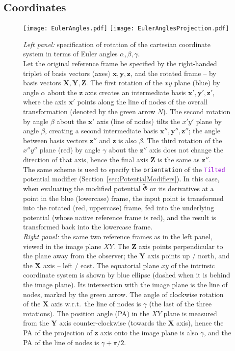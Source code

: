 \documentclass[12pt]{article}
\newcommand{\ttt}[1]{\textcolor{darkviolet}{\texttt{#1}}}
\newcommand{\ppp}[1]{\textcolor{darkolive} {\texttt{#1}}}
\newcommand{\bx}{\boldsymbol{x}}
\newcommand{\by}{\boldsymbol{y}}
\newcommand{\bz}{\boldsymbol{z}}
\newcommand{\bX}{\boldsymbol{X}}
\newcommand{\bY}{\boldsymbol{Y}}
\newcommand{\bZ}{\boldsymbol{Z}}
\begin{document}
\subsection{Coordinates}  \label{sec:CoordinateDetails}

\begin{figure}
\begin{center}
\texttt{[image: EulerAngles.pdf]} \hspace{1cm}
\texttt{[image: EulerAnglesProjection.pdf]}
\end{center}
\caption{\textit{Left panel:} specification of rotation of the cartesian coordinate system in terms of Euler angles $\alpha,\beta,\gamma$.\protect\\
Let the original reference frame be specified by the right-handed triplet of basis vectors (axes) $\bx,\by,\bz$, and the rotated frame -- by basis vectors $\bX,\bY,\bZ$.
The first rotation of the $xy$ plane (blue) by angle $\alpha$ about the $\bz$ axis creates an intermediate basis $\bx',\by',\bz'$, where the axis $\bx'$ points along the line of nodes of the overall transformation (denoted by the green arrow $N$).
The second rotation by angle $\beta$ about the $\bx'$ axis (line of nodes) tilts the $x'y'$ plane by angle $\beta$, creating a second intermediate basis $\bx'',\by'',\bz''$; the angle between basis vectors $\bz''$ and $\bz$ is also $\beta$.
The third rotation of the $x''y''$ plane (red) by angle $\gamma$ about the $\bz''$ axis does not change the direction of that axis, hence the final axis $\bZ$ is the same as $\bz''$. \protect\\
The same scheme is used to specify the \ppp{orientation} of the \ttt{Tilted} potential modifier (Section~\ref{sec:PotentialModifiers}). In this case, when evaluating the modified potential $\widetilde\Phi$ or its derivatives at a point in the blue (lowercase) frame, the input point is transformed into the rotated (red, uppercase) frame, fed into the underlying potential (whose native reference frame is red), and the result is transformed back into the lowercase frame.
\protect\\
\textit{Right panel:} the same two reference frames as in the left panel, viewed in the image plane $XY$. The $\bZ$ axis points perpendicular to the plane away from the observer; the $\bY$ axis points up / north, and the $\bX$ axis -- left / east. The equatorial plane $xy$ of the intrinsic coordinate system is shown by blue ellipse (dashed when it is behind the image plane). Its intersection with the image plane is the line of nodes, marked by the green arrow. The angle of clockwise rotation of the $\bX$ axis w.r.t.\ the line of nodes is $\gamma$ (the last of the three rotations). The position angle (PA) in the $XY$ plane is measured from the $\bY$ axis counter-clockwise (towards the $\bX$ axis), hence the PA of the projection of $\bz$ axis onto the image plane is also $\gamma$, and the PA of the line of nodes is $\gamma+\pi/2$.
} \label{fig:EulerAngles}
\end{figure}
\end{document}
